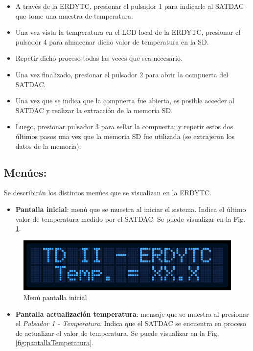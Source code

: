 \documentclass[conference]{IEEEtran}
\begin{document}
\begin{itemize}
\item A través de la ERDYTC, presionar el pulsador 1 para indicarle al SATDAC que tome una muestra de temperatura.
\item Una vez vista la temperatura en el LCD local de la ERDYTC, presionar el pulsador 4 para almacenar dicho valor de temperatura en la SD.
\item Repetir dicho proceso todas las veces que sea necesario.
\item Una vez finalizado, presionar el pulsador 2 para abrir la ocmpuerta del SATDAC.
\item Una vez que se indica que la compuerta fue abierta, es posible acceder al SATDAC y realizar la extracción de la memoria SD.
\item Luego, presionar pulsador 3 para sellar la compuerta; y repetir estos dos últimos pasos una vez que la memoria SD fue utilizada (se extrajeron los datos de la memoria).
\end{itemize}
\subsection{Menúes:}
\label{sec:org082b5aa}
Se describirán los distintos menúes que se visualizan en la ERDYTC.

\begin{itemize}
\item \textbf{Pantalla inicial}: menú que se muestra al iniciar el sistema. Indica el último valor de temperatura medido por el SATDAC. Se puede visualizar en la Fig. \ref{fig:pantallaInicial}.
\end{itemize}

\begin{figure}[htbp]
\centering
\includegraphics[width=.9\linewidth]{../../images/pantallaInicial.png}
\caption{\label{fig:pantallaInicial}Menú pantalla inicial}
\end{figure}

\begin{itemize}
\item \textbf{Pantalla actualización temperatura}: mensaje que se muestra al presionar el \emph{Pulsador 1 - Temperatura}. Indica que el SATDAC se encuentra en proceso de actualizar el valor de temperatura. Se puede visualizar en la Fig. \ref{fig:pantallaTemperatura}.
\end{itemize}
\end{document}
